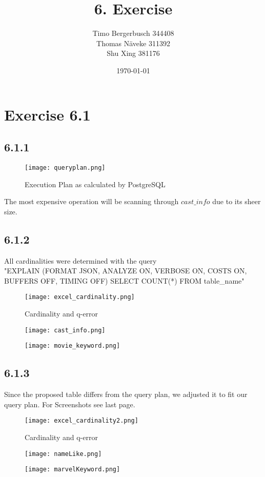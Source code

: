 \documentclass[12pt]{article}
\begin{document}
	
	\title{6. Exercise}
	\author{Timo Bergerbusch 344408 \\ Thomas Näveke 311392 \\ Shu Xing 381176}
	\date{\specialdate\today}
	\maketitle
	
	\section*{Exercise 6.1}
	\subsection*{6.1.1}
		\begin{figure}[h!]
 		 \texttt{[image: queryplan.png]}
		  \caption{Execution Plan as calculated by PostgreSQL}
 		 \label{fig:queryplan}
		\end{figure}	
		The most expensive operation will be scanning through $cast\_info$ due to its sheer size.
	\subsection*{6.1.2}
	All cardinalities were determined with the query 	\\
	"EXPLAIN (FORMAT JSON, ANALYZE ON, VERBOSE ON, COSTS ON, \\
	BUFFERS OFF, TIMING OFF)  SELECT COUNT(*) FROM  table\_name"
		\begin{figure}[h!]
 		 \texttt{[image: excel\_cardinality.png]}
		  \caption{Cardinality and q-error}
 		 \label{fig:cardinality}
		\end{figure}	
		\begin{figure}[h!]
 		 \texttt{[image: cast\_info.png]}
		\end{figure}	
		\begin{figure}[h!]
 		 \texttt{[image: movie\_keyword.png]}
		\end{figure}	
	\subsection*{6.1.3}
	Since the proposed table differs from the query plan, we adjusted it to fit our query plan. For Screenshots see last page.
		\begin{figure}[h!]
 		 \texttt{[image: excel\_cardinality2.png]}
		  \caption{Cardinality and q-error}
 		 \label{fig:cardinality2}
		\end{figure}	
		\begin{figure}[hp!]
 		 \texttt{[image: nameLike.png]}
		\end{figure}
		\begin{figure}[h!]
 		 \texttt{[image: marvelKeyword.png]}

		\end{figure}	
\end{document}
